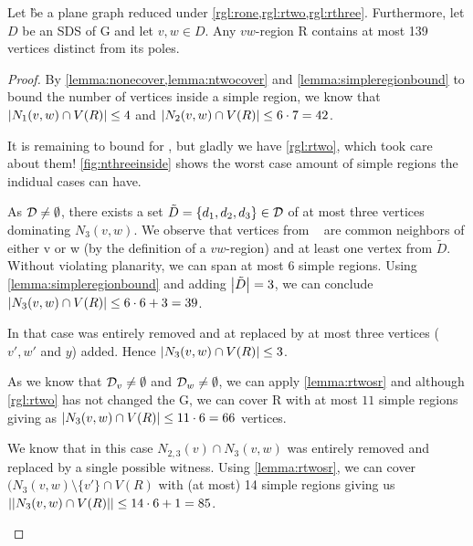 \begin{lemma}\label{lemma:inside}
    Let \G be a plane graph reduced under \cref{rgl:rone,rgl:rtwo,rgl:rthree}. Furthermore, let $D$ be an SDS of G and let $v,w \in D$. Any $vw$-region R contains at most 139 vertices distinct from its poles.
\end{lemma}
\begin{proof} 
    By \cref{lemma:nonecover,lemma:ntwocover} and \cref{lemma:simpleregionbound} to bound the number of vertices inside a simple region, we know that $\abs{N_1(v,w) \cap V(R)} \leq 4$ and $\abs{N_2(v,w) \cap V(R)} \leq 6 \cdot 7 = 42$.
    
    It is remaining to bound for \nthi, but gladly we have \cref{rgl:rtwo}, which took care about them! \cref{fig:nthreeinside} shows the worst case amount of simple regions the indidual cases can have.
    
    \begin{caseofz}
         As $\mathcal{D} \neq \emptyset$, there exists a set $\tilde D = \{d_1,d_2,d_3\} \in \mathcal{D}$ of at most three vertices dominating $N_3(v,w)$. We observe that vertices from \nthi~ are common neighbors of either v or w (by the definition of a $vw$-region) and at least one vertex from $\tilde D$. Without violating planarity, we can span at most 6 simple regions. Using \cref{lemma:simpleregionbound} and adding $\abs{\tilde D} = 3$, we can conclude $\abs{N_3(v,w) \cap V(R)} \leq 6 \cdot 6 + 3 = 39$.
        
        In that case \ntwi was entirely removed and at \nthi replaced by at most three vertices ($v', w'$ and $y$) added. Hence $\abs{N_3(v,w) \cap V(R)} \leq 3$.
        
         As we know that $\mathcal{D}_{v} \neq \emptyset$ and $\mathcal{D}_{w} \neq \emptyset$, we can apply \cref{lemma:rtwosr} and although \cref{rgl:rtwo} has not changed the G, we can cover R with at most $11$ simple regions giving as $\abs{N_3(v,w) \cap V(R)} \leq 11 \cdot 6 = 66$ vertices. 
        
         We know that in this case $N_{2,3}(v) \cap N_3(v,w)$ was entirely removed and replaced by a single possible witness. Using \cref{lemma:rtwosr}, we can cover $(N_3(v,w) \setminus \{v'\} \cap V(R)$ with (at most) 14 simple regions giving us $\abs{\abs{N_3(v,w) \cap V(R)}} \leq 14 \cdot 6 + 1 = 85$.
    \end{caseofz}
    

\end{proof}
